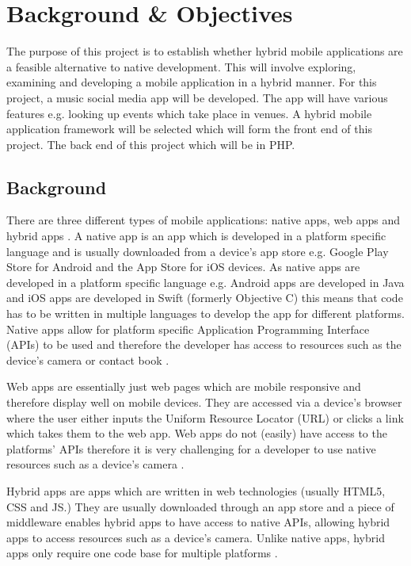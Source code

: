 \chapter{Background \& Objectives}

The purpose of this project is to establish whether hybrid mobile applications are a feasible alternative to native development. This will involve exploring, examining and developing a mobile application in a hybrid manner. For this project, a music social media app will be developed. The app will have various features e.g. looking up events which take place in  venues. A hybrid mobile application framework will be selected which will form the front end of this project. The back end of this project which will be in PHP.

\section{Background}
There are three different types of mobile applications: native apps, web apps and  hybrid apps \cite{BAB} \cite{IIA} \cite{PTA}. A native app is an app which is developed in a platform specific language and is usually downloaded from a device's app store e.g. Google Play Store for Android and the App Store for iOS devices. As  native apps are developed in a platform specific language e.g. Android apps are developed in Java \cite{AD} and iOS apps are developed in Swift (formerly Objective C) \cite{ID} this means that  code has to be written in multiple languages to develop the app for different platforms. Native apps allow for platform specific Application Programming Interface (APIs) to be used and therefore the developer has access to resources such as the device's camera or contact book \cite{MAC} \cite{drupal}.

Web apps are essentially just web pages which are mobile responsive and therefore display well on mobile devices. They are accessed via a device's browser where the user either inputs the Uniform Resource Locator (URL) or clicks a link which takes them to the web app. Web apps do not (easily) have access to the platforms' APIs therefore it is very challenging for a developer to use native resources such as a device's camera \cite{MAC} \cite{BAB}.

Hybrid apps are apps which are written in web technologies (usually HTML5, CSS and JS.) They are usually downloaded through an app store and a piece of middleware enables hybrid apps to have access to native APIs, allowing hybrid apps to access resources such as a device's camera. Unlike native apps, hybrid apps only require one code base for multiple platforms\cite{MAC} \cite{SF}.

